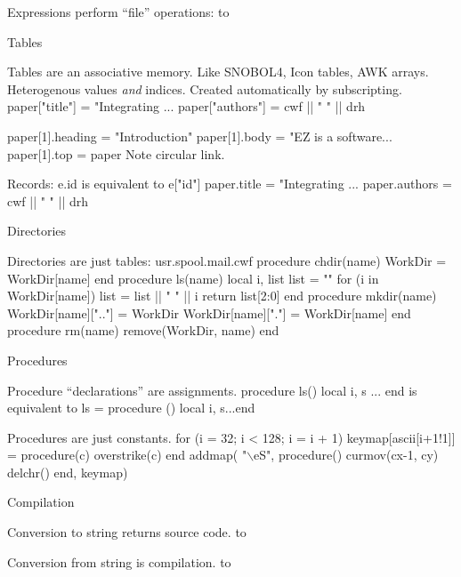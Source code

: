 \Bullet Expressions perform ``file'' operations:
\medskip
\tabskip=0pt \halign to 

\NewPage
\centerline{\bigrm Tables}

\Bullet Tables are an associative memory.
		Like SNOBOL4, Icon tables, AWK arrays.
		Heterogenous values {\it and\/} indices.
		Created automatically by subscripting.
\program
		paper["title"] = "Integrating ...
		paper["authors"] = cwf || " " || drh

		paper[1].heading = "Introduction"
		paper[1].body = "EZ is a software...	
		paper[1].top = paper
\endprogram
\medskip
		Note circular link.

\Bullet Records:  {\pt e.id} is equivalent to {\pt e["id"]}
\program
		paper.title = "Integrating ...
		paper.authors = cwf || " " || drh
\endprogram

\NewPage
\centerline{\bigrm Directories}
\Bullet Directories are just tables:  {\pt usr.spool.mail.cwf}
\program
		procedure chdir(name)
			WorkDir = WorkDir[name]
		end
\medskip
		procedure ls(name) local i, list
			list = ""
			for (i in WorkDir[name])
				list = list || " " || i
			return list[2:0]
		end
\medskip
		procedure mkdir(name)
			WorkDir[name][".."] = WorkDir
			WorkDir[name]["."] = WorkDir[name]
		end
\medskip
		procedure rm(name)
			remove(WorkDir, name)
		end
\endprogram

\NewPage
\centerline{\bigrm Procedures}
\Bullet Procedure ``declarations'' are assignments.
\program
		procedure ls() local i, s ... end
\endprogram
\medskip
		is equivalent to
\program
		ls = procedure () local i, s...end
\endprogram

\Bullet Procedures are just constants.
\program
		for (i = 32; i < 128; i = i + 1)
			keymap[ascii[i+1!1]] = 
				procedure(c) overstrike(c) end
\medskip
		addmap(
			"$\backslash$eS", 
			procedure()
				curmov(cx-1, cy)
				delchr()
			end,
			keymap)
\endprogram

\NewPage
\centerline{\bigrm Compilation}
\Bullet Conversion to string returns source code.
\medskip
\tabskip=0pt \halign to 

\Bullet Conversion from string is compilation.
\tabskip=0pt \halign to 

